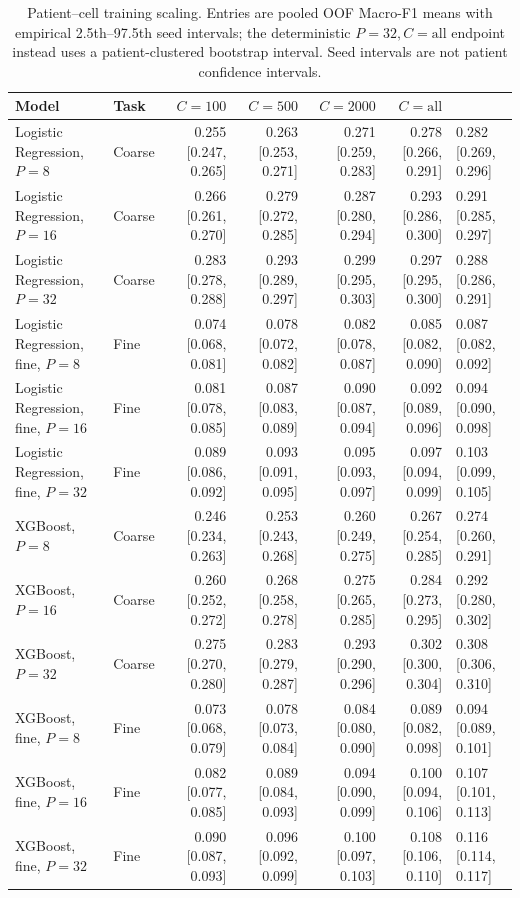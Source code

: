 \begin{table}[t]
\centering
\small
\begin{tabular}{llrrrr}
\toprule
Model & Task & $C=100$ & $C=500$ & $C=2000$ & $C=\mathrm{all}$ \\
\midrule
Logistic Regression, $P=8$ & Coarse & 0.255 [0.247, 0.265] & 0.263 [0.253, 0.271] & 0.271 [0.259, 0.283] & 0.278 [0.266, 0.291] & 0.282 [0.269, 0.296] \\
Logistic Regression, $P=16$ & Coarse & 0.266 [0.261, 0.270] & 0.279 [0.272, 0.285] & 0.287 [0.280, 0.294] & 0.293 [0.286, 0.300] & 0.291 [0.285, 0.297] \\
Logistic Regression, $P=32$ & Coarse & 0.283 [0.278, 0.288] & 0.293 [0.289, 0.297] & 0.299 [0.295, 0.303] & 0.297 [0.295, 0.300] & 0.288 [0.286, 0.291] \\
Logistic Regression, fine, $P=8$ & Fine & 0.074 [0.068, 0.081] & 0.078 [0.072, 0.082] & 0.082 [0.078, 0.087] & 0.085 [0.082, 0.090] & 0.087 [0.082, 0.092] \\
Logistic Regression, fine, $P=16$ & Fine & 0.081 [0.078, 0.085] & 0.087 [0.083, 0.089] & 0.090 [0.087, 0.094] & 0.092 [0.089, 0.096] & 0.094 [0.090, 0.098] \\
Logistic Regression, fine, $P=32$ & Fine & 0.089 [0.086, 0.092] & 0.093 [0.091, 0.095] & 0.095 [0.093, 0.097] & 0.097 [0.094, 0.099] & 0.103 [0.099, 0.105] \\
\midrule
XGBoost, $P=8$ & Coarse & 0.246 [0.234, 0.263] & 0.253 [0.243, 0.268] & 0.260 [0.249, 0.275] & 0.267 [0.254, 0.285] & 0.274 [0.260, 0.291] \\
XGBoost, $P=16$ & Coarse & 0.260 [0.252, 0.272] & 0.268 [0.258, 0.278] & 0.275 [0.265, 0.285] & 0.284 [0.273, 0.295] & 0.292 [0.280, 0.302] \\
XGBoost, $P=32$ & Coarse & 0.275 [0.270, 0.280] & 0.283 [0.279, 0.287] & 0.293 [0.290, 0.296] & 0.302 [0.300, 0.304] & 0.308 [0.306, 0.310] \\
XGBoost, fine, $P=8$ & Fine & 0.073 [0.068, 0.079] & 0.078 [0.073, 0.084] & 0.084 [0.080, 0.090] & 0.089 [0.082, 0.098] & 0.094 [0.089, 0.101] \\
XGBoost, fine, $P=16$ & Fine & 0.082 [0.077, 0.085] & 0.089 [0.084, 0.093] & 0.094 [0.090, 0.099] & 0.100 [0.094, 0.106] & 0.107 [0.101, 0.113] \\
XGBoost, fine, $P=32$ & Fine & 0.090 [0.087, 0.093] & 0.096 [0.092, 0.099] & 0.100 [0.097, 0.103] & 0.108 [0.106, 0.110] & 0.116 [0.114, 0.117] \\
\midrule
\bottomrule
\end{tabular}
\caption{Patient--cell training scaling. Entries are pooled OOF Macro-F1 means with empirical 2.5th--97.5th seed intervals; the deterministic $P=32,C=\mathrm{all}$ endpoint instead uses a patient-clustered bootstrap interval. Seed intervals are not patient confidence intervals.}
\label{tab:patient_cell_scaling}
\end{table}
